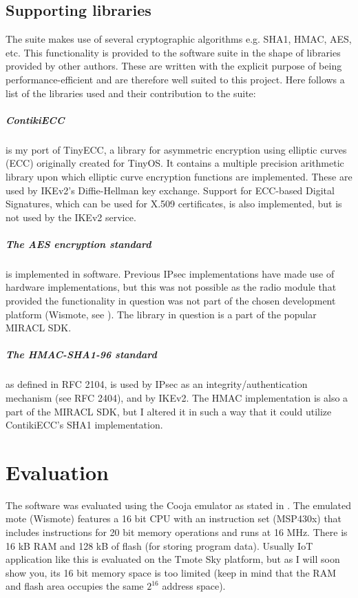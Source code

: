 \documentclass[final,a4paper,twoside,11pt,onecolumn]{report}
\begin{document}
\section{Supporting libraries}
The suite makes use of several cryptographic algorithms e.g. SHA1, HMAC, AES, etc. This functionality is provided to the software suite in the shape of libraries provided by other authors. These are written with the explicit purpose of being performance-efficient and are therefore well suited to this project. Here follows a list of the libraries used and their contribution to the suite:

\paragraph{ContikiECC} is my port of TinyECC, a library for asymmetric encryption using elliptic curves (ECC) originally created for TinyOS. It contains a multiple precision arithmetic library upon which elliptic curve encryption functions are implemented. These are used by IKEv2's Diffie-Hellman key exchange. Support for ECC-based Digital Signatures, which can be used for X.509 certificates, is also implemented, but is not used by the IKEv2 service.

\paragraph{The AES encryption standard} is implemented in software. Previous IPsec implementations\cite{raza11securing} have made use of hardware implementations, but this was not possible as the radio module that provided the functionality in question was not part of the chosen development platform (Wismote, see ). The library in question is a part of the popular MIRACL SDK.

\paragraph{The HMAC-SHA1-96 standard} as defined in RFC 2104\cite{rfc2104}, is used by IPsec as an integrity/authentication mechanism (see RFC 2404\cite{rfc2404}), and by IKEv2. The HMAC implementation is also a part of the MIRACL SDK, but I altered it in such a way that it could utilize ContikiECC's SHA1 implementation.


\chapter{Evaluation}
\label{cha:eval}
The software was evaluated using the Cooja emulator as stated in . The emulated mote (Wismote) features a 16 bit CPU with an instruction set (MSP430x) that includes instructions for 20 bit memory operations and runs at 16 MHz. There is 16 kB RAM and 128 kB of flash (for storing program data). Usually IoT application like this is evaluated on the Tmote Sky platform, but as I will soon show you, its 16 bit memory space is too limited (keep in mind that the RAM and flash area occupies the same $2^16$ address space).
\end{document}

